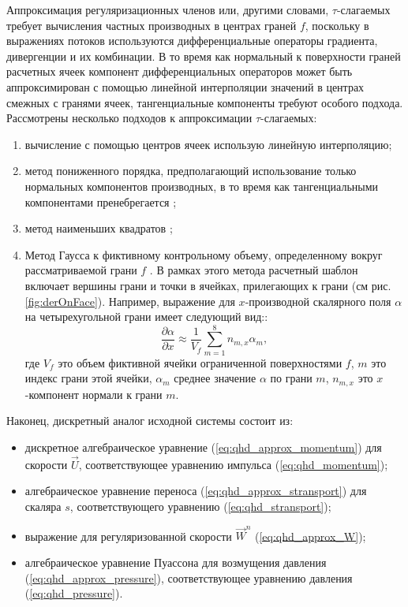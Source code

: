 Аппроксимация регуляризационных членов или, другими словами, $\tau$-слагаемых требует вычисления частных производных в центрах граней $f$, поскольку в выражениях потоков используются дифференциальные операторы градиента, дивергенции и их комбинации. В то время как нормальный к поверхности граней расчетных ячеек компонент дифференциальных операторов может быть аппроксимирован с помощью линейной интерполяции значений в центрах смежных с гранями ячеек, тангенциальные компоненты требуют особого подхода. Рассмотрены несколько подходов к аппроксимации $\tau$-слагаемых:
\begin{enumerate}
    \item вычисление с помощью центров ячеек использую линейную интерполяцию;
    \item метод пониженного порядка, предполагающий использование только нормальных компонентов производных, в то время как тангенциальными компонентами пренебрегается \cite{Kraposhin2017};
    \item метод наименьших квадратов \cite{Kraposhin2017};
    \item Метод Гаусса к фиктивному контрольному объему, определенному вокруг рассматриваемой грани $f$ \cite{Istomina2019}. В рамках этого метода расчетный шаблон включает вершины грани и точки в ячейках, прилегающих к грани (см рис. \ref{fig:derOnFace}). Например, выражение для $x$-производной скалярного поля $\alpha$ на четырехугольной грани имеет следующий вид::
    \begin{equation}
        \frac{\partial \alpha}{\partial x} \approx
        \frac{1}{V_f} \sum_{m=1}^8 n_{m,x} \alpha_m,
    \end{equation}
    где $V_f$ это объем фиктивной ячейки ограниченной поверхностями $f$, $m$ это индекс грани этой ячейки, $\alpha_m$ среднее значение $\alpha$ по грани $m$, $n_{m,x}$ это  $x$-компонент нормали к грани $m$.
    
\end{enumerate}

Наконец, дискретный аналог исходной системы состоит из:

\begin{itemize}
     \item дискретное алгебраическое уравнение (\ref{eq:qhd_approx_momentum}) для скорости $\vec U$, соответствующее уравнению импульса (\ref{eq:qhd_momentum});
     \item алгебраическое уравнение переноса (\ref{eq:qhd_approx_stransport}) для скаляра $s$, соответствующего уравнению (\ref{eq:qhd_stransport});
     \item выражение для регуляризованной скорости $\vec W^n $ (\ref{eq:qhd_approx_W});
     \item алгебраическое уравнение Пуассона для возмущения давления ~ (\ref{eq:qhd_approx_pressure}), соответствующее уравнению давления (\ref{eq:qhd_pressure}).
\end{itemize}

